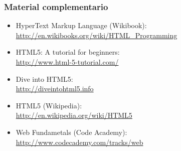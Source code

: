 \documentclass[ucs]{beamer}
\begin{document}

\begin{frame}
\frametitle{Material complementario}

\begin{itemize}
\item HyperText Markup Language (Wikibook): \\
  \url{http://en.wikibooks.org/wiki/HTML_Programming}
\item HTML5: A tutorial for beginners: \\
  \url{http://www.html-5-tutorial.com/}
\item Dive into HTML5: \\
  \url{http://diveintohtml5.info}
\item HTML5 (Wikipedia): \\
  \url{http://en.wikipedia.org/wiki/HTML5}
\item Web Fundametals (Code Academy): \\
  \url{http://www.codecademy.com/tracks/web}
\end{itemize}


\end{frame}


\end{document}
